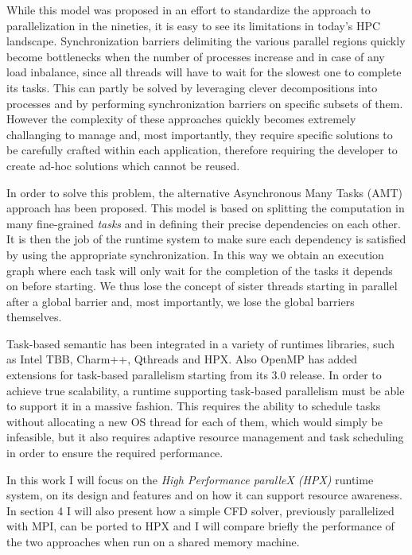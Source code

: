 While this model was proposed in an effort to standardize the approach to parallelization in the nineties, it is easy to see its limitations in today's HPC landscape.
Synchronization barriers delimiting the various parallel regions quickly become bottlenecks when the number of processes increase and in case of any load inbalance, since all threads will have to wait for the slowest one to complete its tasks.
This can partly be solved by leveraging clever decompositions into processes and by performing synchronization barriers on specific subsets of them. However the complexity of these approaches quickly becomes extremely challanging to manage and, most importantly, they require specific solutions to be carefully crafted within each application, therefore requiring the developer to create ad-hoc solutions which cannot be reused.

In order to solve this problem, the alternative Asynchronous Many Tasks (AMT) approach has been proposed. This model is based on splitting the computation in many fine-grained \emph{tasks} and in defining their precise dependencies on each other.
It is then the job of the runtime system to make sure each dependency is satisfied by using the appropriate synchronization.
In this way we obtain an execution graph where each task will only wait for the completion of the tasks it depends on before starting. We thus lose the concept of sister threads starting in parallel after a global barrier and, most importantly, we lose the global barriers themselves.


Task-based semantic has been integrated in a variety of runtimes libraries, such as Intel TBB, Charm++, Qthreads and HPX. Also OpenMP has added extensions for task-based parallelism starting from its 3.0 release. 
In order to achieve true scalability, a runtime supporting task-based parallelism must be able to support it in a massive fashion. This requires the ability to schedule tasks without allocating a new OS thread for each of them, which would simply be infeasible, but it also requires adaptive resource management and task scheduling in order to ensure the required performance.

In this work I will focus on the \emph{High Performance paralleX (HPX)} runtime system, on its design and features and on how it can support resource awareness.
In section 4  I will also present how a simple CFD solver, previously parallelized with MPI, can be ported to HPX and I will compare briefly the performance of the two approaches when run on a shared memory machine.


